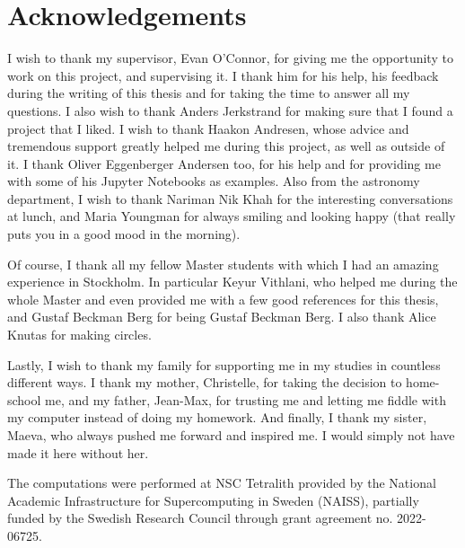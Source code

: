 \chapter*{Acknowledgements}

\renewcommand{\epigraphflush}{flushright}
\setlength{\epigraphwidth}{0.6\textwidth}
\vspace{2\baselineskip}

I wish to thank my supervisor, Evan O'Connor, for giving me the opportunity to work on this project, and supervising it. I thank him for his help, his feedback during the writing of this thesis and for taking the time to answer all my questions. I also wish to thank Anders Jerkstrand for making sure that I found a project that I liked. I wish to thank Haakon Andresen, whose advice and tremendous support greatly helped me during this project, as well as outside of it. I thank Oliver Eggenberger Andersen too, for his help and for providing me with some of his Jupyter Notebooks as examples. Also from the astronomy department, I wish to thank Nariman Nik Khah for the interesting conversations at lunch, and Maria Youngman for always smiling and looking happy (that really puts you in a good mood in the morning).

Of course, I thank all my fellow Master students with which I had an amazing experience in Stockholm. In particular Keyur Vithlani, who helped me during the whole Master and even provided me with a few good references for this thesis, and Gustaf Beckman Berg for being Gustaf Beckman Berg. I also thank Alice Knutas for making circles.

Lastly, I wish to thank my family for supporting me in my studies in countless different ways. I thank my mother, Christelle, for taking the decision to home-school me, and my father, Jean-Max, for trusting me and letting me fiddle with my computer instead of doing my homework. And finally, I thank my sister, Maeva, who always pushed me forward and inspired me. I would simply not have made it here without her.

The computations were performed at NSC Tetralith provided by the National Academic Infrastructure for Supercomputing in Sweden (NAISS), partially funded by the Swedish Research Council through grant agreement no. 2022-06725.
